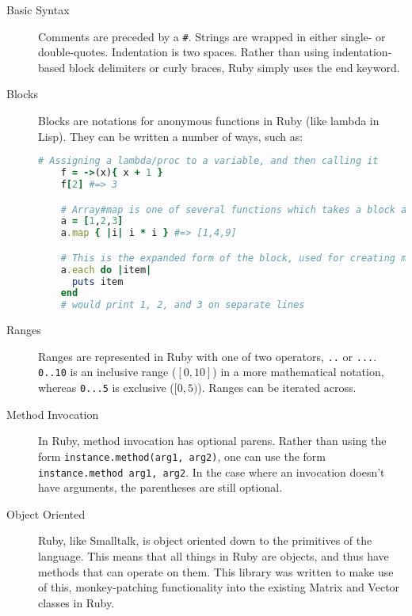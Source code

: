 \documentclass[letterpaper,11pt]{article}
\begin{document}
\begin{description}

\item[Basic Syntax]

  Comments are preceded by a \texttt{\#}.
  Strings are wrapped in either single- or double-quotes.
  Indentation is two spaces.
  Rather than using indentation-based block delimiters or curly braces,
  Ruby simply uses the end keyword.

\item[Blocks]

  Blocks are notations for anonymous functions in Ruby (like lambda in Lisp).
  They can be written a number of ways, such as:
  
  \begin{lstlisting}[language=ruby]
    # Assigning a lambda/proc to a variable, and then calling it
    f = ->(x){ x + 1 }
    f[2] #=> 3

    # Array#map is one of several functions which takes a block as an argument
    a = [1,2,3]
    a.map { |i| i * i } #=> [1,4,9]

    # This is the expanded form of the block, used for creating multi-line anonymous functions
    a.each do |item|
      puts item
    end
    # would print 1, 2, and 3 on separate lines
  \end{lstlisting}
  
\item[Ranges]
  
  Ranges are represented in Ruby with one of two operators, \texttt{..} or \texttt{...}.
  \texttt{0..10} is an inclusive range ($[0,10]$) in a more mathematical notation,
  whereas \texttt{0...5} is exclusive ($[0,5)$).
  Ranges can be iterated across.
  
\item[Method Invocation]

  In Ruby, method invocation has optional parens.
  Rather than using the form \texttt{instance.method(arg1, arg2)},
  one can use the form \texttt{instance.method arg1, arg2}.
  In the case where an invocation doesn't have arguments,
  the parentheses are still optional.

\item[Object Oriented]

  Ruby, like Smalltalk, is object oriented down to the primitives of the language.
  This means that all things in Ruby are objects, and thus have methods that can
  operate on them.
  This library was written to make use of this, monkey-patching functionality into
  the existing Matrix and Vector classes in Ruby.


\end{description}
\end{document}

